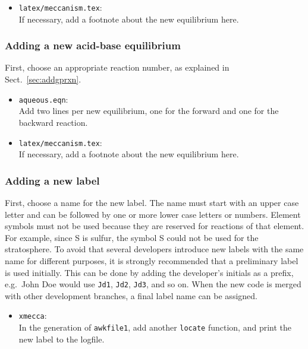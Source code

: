 \documentclass[twoside]{article}
\def\nosep{\setlength\parsep{0mm}\setlength\topsep{0mm}\setlength\itemsep{0mm}}
\begin{document}
\begin{itemize}\nosep
\item \verb|latex/meccanism.tex|:\\
  If necessary, add a footnote about the new equilibrium here.
\end{itemize}

\subsubsection{Adding a new acid-base equilibrium}

First, choose an appropriate reaction number, as explained in
Sect.~\ref{sec:addgprxn}.

\begin{itemize}\nosep
\item \verb|aqueous.eqn|:\\
  Add two lines per new equilibrium, one for the forward and one for the
  backward reaction.
\end{itemize}

\begin{itemize}\nosep
\item \verb|latex/meccanism.tex|:\\
  If necessary, add a footnote about the new equilibrium here.
\end{itemize}

\subsubsection{Adding a new label}
\label{sec:newlabel}

First, choose a name for the new label. The name must start with an
upper case letter and can be followed by one or more lower case letters
or numbers. Element symbols must not be used because they are reserved
for reactions of that element. For example, since S is sulfur, the
symbol S could not be used for the stratosphere. To avoid that several
developers introduce new labels with the same name for different
purposes, it is strongly recommended that a preliminary label is used
initially. This can be done by adding the developer's initials as a
prefix, e.g.\ John Doe would use \verb|Jd1|, \verb|Jd2|, \verb|Jd3|, and
so on. When the new code is merged with other development branches, a
final label name can be assigned.

\begin{itemize}\nosep
\item \verb|xmecca|:\\
  In the generation of \verb|awkfile1|, add another \verb|locate|
  function, and print the new label to the logfile.
\end{itemize}
\end{document}

